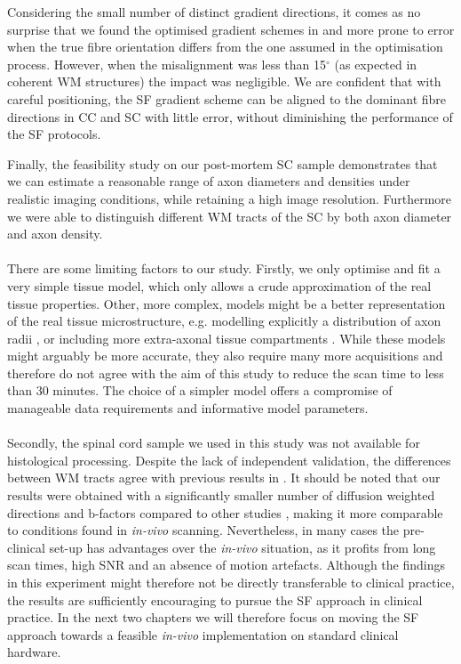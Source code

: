 Considering the small number of distinct gradient directions, it comes as no surprise that we found the optimised gradient schemes in {\FD} and {\DO} more prone to error when the true fibre orientation differs from the one assumed in the optimisation process. However, when the misalignment was less than 15$^\circ$ (as expected in coherent WM structures) the impact was negligible. We are confident that with careful positioning, the {\gls{SF}} gradient scheme can be aligned to the dominant fibre directions in CC and SC with little error, without diminishing the performance of the {\gls{SF}} protocols.


Finally, the feasibility study on our post-mortem SC sample demonstrates that we can estimate a reasonable range of axon diameters and densities under realistic imaging conditions, while retaining a high image resolution. Furthermore we were able to distinguish different WM tracts of the SC by both axon diameter and axon density.
\paragraph{}
There are some limiting factors to our study. Firstly, we only optimise and fit a very simple tissue model, which only allows a crude approximation of the real tissue properties. Other, more complex, models might be a better representation of the real tissue microstructure, e.g. modelling explicitly a distribution of axon radii \citep{Barazany:2009}, or including more extra-axonal tissue compartments \citep{Stanisz:1997,Wang:2011,Panagiotaki:2012}.  While these models might arguably be more accurate, they also require many more acquisitions and therefore do not agree with the aim of this study to reduce the scan time to less than 30 minutes. The choice of a simpler model offers a compromise of manageable data requirements and informative model parameters.
\paragraph{}
Secondly, the spinal cord sample we used in this study was not available for histological processing. Despite the lack of independent validation, the differences between WM tracts agree with previous results in \citep{Golabchi:2010}. It should be noted that our results were obtained with a significantly smaller number of diffusion weighted directions and b-factors compared to other studies \citep{Assaf:2008,Barazany:2009,Panagiotaki:2012}, making it more comparable to conditions found in \emph{in-vivo} scanning. Nevertheless, in many cases the pre-clinical set-up has advantages over the \emph{in-vivo} situation, as it profits from long scan times, high \gls{SNR} and an absence of motion artefacts. Although the findings in this experiment might therefore not be directly transferable to clinical practice, the results are sufficiently encouraging to pursue the \gls{SF}{} approach in clinical practice. In the next two chapters we will therefore focus on moving the \gls{SF}{} approach towards a feasible \emph{in-vivo} implementation on standard clinical hardware.


